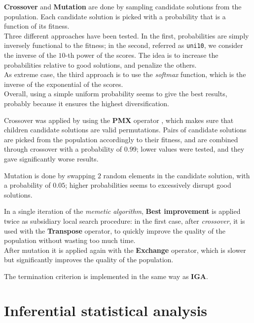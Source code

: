 \documentclass[
12pt,
a4paper,
oneside,
headinclude,
footinclude]{article}
\theoremstyle{definition} %
\begin{document}
\textbf{Crossover} and \textbf{Mutation} are done by sampling candidate solutions from the population. Each candidate solution is picked with a probability that is a function of its fitness. \\
Three different approaches have been tested. In the first, probabilities are simply inversely functional to the fitness; in the second, referred as \texttt{uni10}, we consider the inverse of the $10$-th power of the scores. The idea is to increase the probabilities relative to good solutions, and penalize the others.\\
As extreme case, the third approach is to use the \textit{softmax} function, which is the inverse of the exponential of the scores.  \\
Overall, using a simple uniform probability seems to give the best results, probably because it ensures the highest diversification.

Crossover was applied by using the \textbf{PMX} operator \cite{uccoluk2002genetic}, which makes sure that children candidate solutions are valid permutations.
Pairs of candidate solutions are picked from the population accordingly to their fitness, and are combined through crossover with a probability of $0.99$; lower values were tested, and they gave significantly worse results. 

Mutation is done by swapping $2$ random elements in the candidate solution, with a probability of $0.05$; higher probabilities seems to excessively disrupt good solutions.

In a single iteration of the \textit{memetic algorithm}, \textbf{Best improvement} is applied twice as subsidiary local search procedure: in the first case, after \textit{crossover}, it is used with the \textbf{Transpose} operator, to quickly improve the quality of the population without wasting too much time.\\
After mutation it is applied again with the \textbf{Exchange} operator, which is slower but significantly improves the quality of the population.

The termination criterion is implemented in the same way as \textbf{IGA}.



\section{Inferential statistical analysis}
\end{document}
